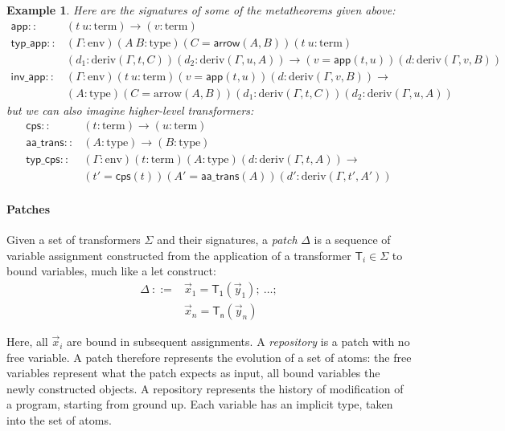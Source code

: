 \documentclass[twoside,a4paper,12pt]{article}
\newtheorem{example}{Example}
\begin{document}
\begin{example}
Here are the signatures of some of the metatheorems given above:
\begin{align*}
  \mathsf{app} :: {} & (t\ u : \mathrm{term}) \longrightarrow
  (v : \mathrm{term}) \\
  \mathsf{typ\_app} ::{}& (\Gamma:\mathrm{env}) (A\ B:\mathrm{type})
  (C=\mathsf{arrow}(A,B)) (t\ u:\mathrm{term}) \\
  {}& (d_1 : \mathrm{deriv}(\Gamma,t,C)) (d_2 :
  \mathrm{deriv}(\Gamma,u,A)) \longrightarrow (v=\mathsf{app}(t,u))
  (d:\mathrm{deriv}(\Gamma,v,B)) \\
  \mathsf{inv\_app} ::{}& (\Gamma:\mathrm{env}) (t\ u:\mathrm{term})
  (v=\mathsf{app}(t,u))(d:\mathrm{deriv}(\Gamma,v,B)) \longrightarrow
  \\ {}&
  (A:\mathrm{type})(C=\mathrm{arrow}(A,B))(d_1:\mathrm{deriv}(\Gamma,t,C))
  (d_2:\mathrm{deriv}(\Gamma,u,A))
\end{align*}
but we can also imagine higher-level transformers:
\begin{align*}
  \mathsf{cps} ::{}& (t:\mathrm{term}) \longrightarrow (u:\mathrm{term}) \\
  \mathsf{aa\_trans} ::{}& (A:\mathrm{type}) \longrightarrow
  (B:\mathrm{type}) \\
  \mathsf{typ\_cps} ::{}& (\Gamma:\mathrm{env}) (t:\mathrm{term}) 
  (A:\mathrm{type}) (d:\mathrm{deriv}(\Gamma,t,A)) 
  \longrightarrow \\ {}&
  (t'=\mathsf{cps}(t))
  (A'=\mathsf{aa\_trans}(A)) (d':\mathrm{deriv}(\Gamma,t',A'))
\end{align*}
\end{example}

\paragraph{Patches}

Given a set of transformers $\Sigma$ and their signatures, a
\emph{patch} $\Delta$ is a sequence of variable assignment constructed
from the application of a transformer $\mathsf{T}_i\in\Sigma$ to bound
variables, much like a \textsf{let} construct:
\begin{align*}
  \Delta\ {}::=& \vec x_1 = \mathsf{T_1}(\vec y_1);\ \ldots;
  \\ {}& \vec x_n = \mathsf{T_n}(\vec y_n)
\end{align*}

Here, all $\vec x_i$ are bound in subsequent assignments.  A
\emph{repository} is a patch with no free variable. A patch therefore
represents the evolution of a set of atoms: the free variables
represent what the patch expects as input, all bound variables the
newly constructed objects. A repository represents the history of
modification of a program, starting from ground up. Each variable has
an implicit type, taken into the set of atoms.
\end{document}

